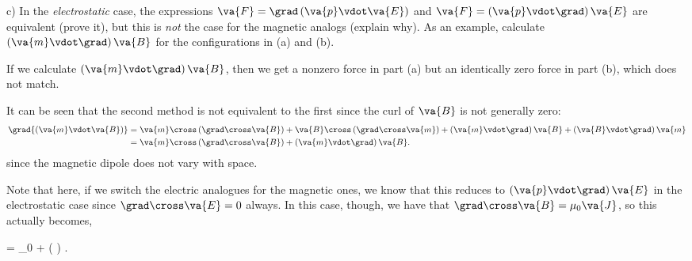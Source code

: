 \documentclass[12pt,a4paper]{article}
\begin{document}
c) In the \textit{electrostatic} case, the expressions $\va{F} = \grad \left( \va{p} \vdot \va{E} \right)$ and $\va{F} = \left( \va{p} \vdot \grad \right) \va{E}$ are equivalent (prove it), but this is \textit{not} the case for the magnetic analogs (explain why).
As an example, calculate $\left( \va{m} \vdot \grad \right) \va{B}$ for the configurations in (a) and (b).

If we calculate $\left( \va{m} \vdot \grad \right) \va{B}$, then we get a nonzero force in part (a) but an identically zero force in part (b), which does not match.

It can be seen that the second method is not equivalent to the first since the curl of $\va{B}$ is not generally zero:
\begin{align*}
    \grad{\left( \va{m} \vdot \va{B} \right)} &= \va{m} \cross \left( \grad \cross \va{B} \right) + \va{B} \cross \left( \grad \cross \va{m} \right) + \left( \va{m} \vdot \grad \right) \va{B} + \left( \va{B} \vdot \grad \right) \va{m} \\
    &= \va{m} \cross \left( \grad \cross \va{B}\right) + \left( \va{m} \vdot \grad \right) \va{B}
.\end{align*}
since the magnetic dipole does not vary with space.

Note that here, if we switch the electric analogues for the magnetic ones, we know that this reduces to $\left( \va{p} \vdot \grad \right) \va{E}$ in the electrostatic case since $\grad \cross \va{E} = 0$ always.
In this case, though, we have that $\grad \cross \va{B} = \mu_0 \va{J}$, so this actually becomes,
\begin{eqbox}
     = \mu_0  \cross {} + \left(  \vdot \grad \right) 
.\end{eqbox}
\end{document}
